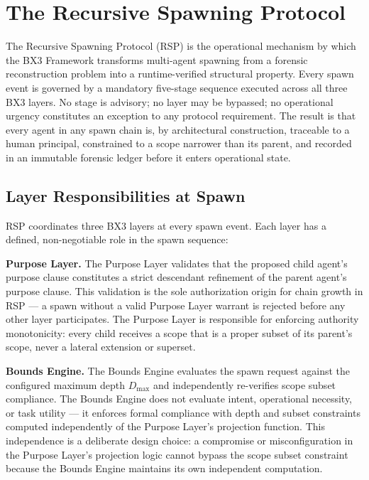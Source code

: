 \section{The Recursive Spawning Protocol}
\label{sec:rs-protocol}

The Recursive Spawning Protocol (RSP) is the operational mechanism by which the BX3 Framework transforms multi-agent spawning from a forensic reconstruction problem into a runtime-verified structural property. Every spawn event is governed by a mandatory five-stage sequence executed across all three BX3 layers. No stage is advisory; no layer may be bypassed; no operational urgency constitutes an exception to any protocol requirement. The result is that every agent in any spawn chain is, by architectural construction, traceable to a human principal, constrained to a scope narrower than its parent, and recorded in an immutable forensic ledger before it enters operational state.

\subsection{Layer Responsibilities at Spawn}

RSP coordinates three BX3 layers at every spawn event. Each layer has a defined, non-negotiable role in the spawn sequence:

\medskip
\noindent\textbf{Purpose Layer.} The Purpose Layer validates that the proposed child agent's purpose clause constitutes a strict descendant refinement of the parent agent's purpose clause. This validation is the sole authorization origin for chain growth in RSP — a spawn without a valid Purpose Layer warrant is rejected before any other layer participates. The Purpose Layer is responsible for enforcing authority monotonicity: every child receives a scope that is a proper subset of its parent's scope, never a lateral extension or superset.

\medskip
\noindent\textbf{Bounds Engine.} The Bounds Engine evaluates the spawn request against the configured maximum depth $D_{\max}$ and independently re-verifies scope subset compliance. The Bounds Engine does not evaluate intent, operational necessity, or task utility — it enforces formal compliance with depth and subset constraints computed independently of the Purpose Layer's projection function. This independence is a deliberate design choice: a compromise or misconfiguration in the Purpose Layer's projection logic cannot bypass the scope subset constraint because the Bounds Engine maintains its own independent computation.

